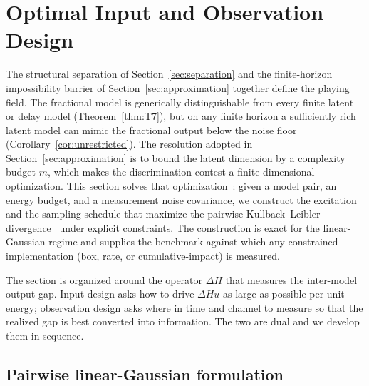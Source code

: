 \section{Optimal Input and Observation Design}
\label{sec:design}

The structural separation of Section~\ref{sec:separation} and the finite-horizon impossibility barrier of Section~\ref{sec:approximation} together define the playing field. The fractional model is generically distinguishable from every finite latent or delay model (Theorem~\ref{thm:T7}), but on any finite horizon a sufficiently rich latent model can mimic the fractional output below the noise floor (Corollary~\ref{cor:unrestricted}). The resolution adopted in Section~\ref{sec:approximation} is to bound the latent dimension by a complexity budget \(m\), which makes the discrimination contest a finite-dimensional optimization. This section solves that optimization~\cite{O01,O02,O03,O04,O10,O11,O12}: given a model pair, an energy budget, and a measurement noise covariance, we construct the excitation and the sampling schedule that maximize the pairwise Kullback--Leibler divergence~\cite{S01,S02,S03,S04,S05} under explicit constraints. The construction is exact for the linear-Gaussian regime and supplies the benchmark against which any constrained implementation (box, rate, or cumulative-impact) is measured.

The section is organized around the operator \(\Delta H\) that measures the inter-model output gap. Input design asks how to drive \(\Delta H u\) as large as possible per unit energy; observation design asks where in time and channel to measure so that the realized gap is best converted into information. The two are dual and we develop them in sequence.

\subsection{Pairwise linear-Gaussian formulation}

